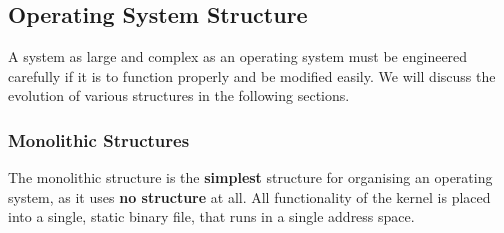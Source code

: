 \documentclass{article}
\begin{document}
\subsection{Operating System Structure}
A system as large and complex as an operating system must be engineered
carefully if it is to function properly and be modified easily. We will
discuss the evolution of various structures in the following sections.
\subsubsection{Monolithic Structures}
The monolithic structure is the \textbf{simplest} structure for
organising an operating system, as it uses \textbf{no structure} at
all. All functionality of the kernel is placed into a single, static
binary file, that runs in a single address space.
\end{document}
